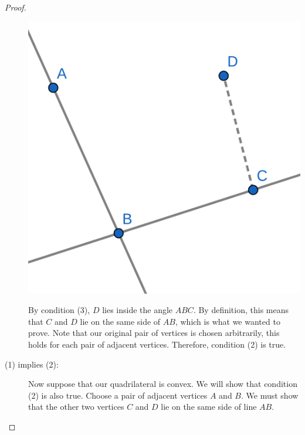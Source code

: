 \documentclass{tufte-handout}
\theoremstyle{definition}
\begin{document}
\begin{proof}
\begin{description}
\begin{marginfigure}
  \includegraphics{images/convex_2.png}
\end{marginfigure}

By condition (3), $D$ lies inside the angle $ABC$. By definition, this means that $C$ and $D$ lie on the same side of $AB$, which is what we wanted to prove. Note that our original pair of vertices is chosen arbitrarily, this holds for each pair of adjacent vertices. Therefore, condition (2) is true.

\item[(1) implies (2):] Now suppose that our quadrilateral is convex. We will show that condition (2) is also true. Choose a pair of adjacent vertices $A$ and $B$. We must show that the other two vertices $C$ and $D$ lie on the same side of line $AB$.



\end{description}
\end{proof}
\end{document}
